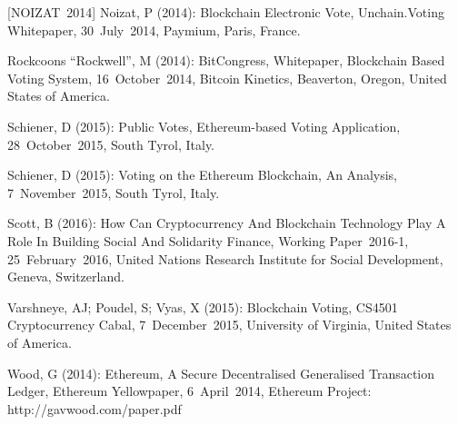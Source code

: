 [NOIZAT~2014] Noizat, P (2014): Blockchain Electronic Vote, Unchain.Voting Whitepaper, 30~July~2014, Paymium, Paris, France.\par
[ROCKWELL~2014] Rockcoons \enquote{Rockwell}, M (2014): BitCongress, Whitepaper, Blockchain Based Voting System, 16~October~2014, Bitcoin Kinetics, Beaverton, Oregon, United States of America.\par
[SCHIENER~2015A] Schiener, D (2015): Public Votes, Ethereum-based Voting Application, 28~October~2015, South Tyrol, Italy.\par
[SCHIENER~2015B] Schiener, D (2015): Voting on the Ethereum Blockchain, An Analysis, 7~November~2015, South Tyrol, Italy.\par
[SCOTT~2016] Scott, B (2016): How Can Cryptocurrency And Blockchain Technology Play A Role In Building Social And Solidarity Finance, Working Paper~2016-1, 25~February~2016, United Nations Research Institute for Social Development, Geneva, Switzerland.\par
[VARSHNEYA~et~al.~2015] Varshneye, AJ; Poudel, S; Vyas, X (2015): Blockchain Voting, CS4501 Cryptocurrency Cabal, 7~December~2015, University of Virginia, United States of America.\par
[WOOD~2014] Wood, G (2014): Ethereum, A Secure Decentralised Generalised Transaction Ledger, Ethereum Yellowpaper, 6~April~2014, Ethereum Project: http://gavwood.com/paper.pdf

